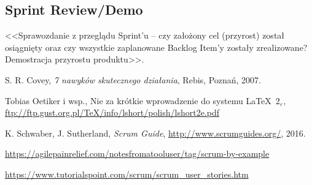 \documentclass[a4paper]{article}
\begin{document}
	
	\subsection{Sprint Review/Demo}
	<<Sprawozdanie z przeglądu Sprint'u -- czy założony cel (przyrost) został osiągnięty oraz czy wszystkie zaplanowane Backlog Item'y zostały zrealizowane? Demostracja przyrostu produktu>>.
	
	
	
	\begin{thebibliography}{9}
		
		 S. R. Covey, {\em 7 nawyków skutecznego działania}, Rebis, Poznań, 2007.
		
		 Tobias Oetiker i wsp., Nie za krótkie wprowadzenie do systemu \LaTeX  \ $2_\varepsilon$, \url{ftp://ftp.gust.org.pl/TeX/info/lshort/polish/lshort2e.pdf}
		
		 K. Schwaber, J. Sutherland, {\em Scrum Guide}, \url{http://www.scrumguides.org/}, 2016.
		
		 \url{https://agilepainrelief.com/notesfromatooluser/tag/scrum-by-example}
		
		 \url{https://www.tutorialspoint.com/scrum/scrum_user_stories.htm}
		
	\end{thebibliography}
	
\end{document}
